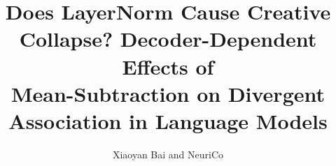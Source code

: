 \documentclass{article}
\title{Does LayerNorm Cause Creative Collapse? Decoder-Dependent Effects of \\
       Mean-Subtraction on Divergent Association in Language Models}
\author{Xiaoyan Bai and NeuriCo}
\begin{document}
\maketitle

\begin{abstract}

\end{abstract}









\end{document}
